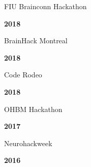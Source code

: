 \documentclass[10pt]{article}
\newcommand{\sectionstyle}{\LARGE \fontfamily{lmr}\selectfont}
\begin{document}
\begin{minipage}[t]{.85\linewidth}
	\flushleft
	\noindent
	FIU Brainconn Hackathon
	\end{minipage}
	\hfill
	\begin{minipage}[t]{.15\linewidth}
	\flushright
	\noindent
	\textsc{\textbf{2018}}
\end{minipage}

\begin{minipage}[t]{.85\linewidth}
	\flushleft
	\noindent
	BrainHack Montreal
	\end{minipage}
	\hfill
	\begin{minipage}[t]{.15\linewidth}
	\flushright
	\noindent
	\textsc{\textbf{2018}}
\end{minipage}

\begin{minipage}[t]{.85\linewidth}
	\flushleft
	\noindent
	Code Rodeo
	\end{minipage}
	\hfill
	\begin{minipage}[t]{.15\linewidth}
	\flushright
	\noindent
	\textsc{\textbf{2018}}
\end{minipage}

\begin{minipage}[t]{.85\linewidth}
	\flushleft
	\noindent
	OHBM Hackathon
	\end{minipage}
	\hfill
	\begin{minipage}[t]{.15\linewidth}
	\flushright
	\noindent
	\textsc{\textbf{2017}}
\end{minipage}

\begin{minipage}[t]{.85\linewidth}
	\flushleft
	\noindent
	Neurohackweek
	\end{minipage}
	\hfill
	\begin{minipage}[t]{.15\linewidth}
	\flushright
	\noindent
	\textsc{\textbf{2016}}
\end{minipage}

\bigskip

\begin{center}\sectionstyle{PUBLICATIONS}\end{center}
\end{document}
